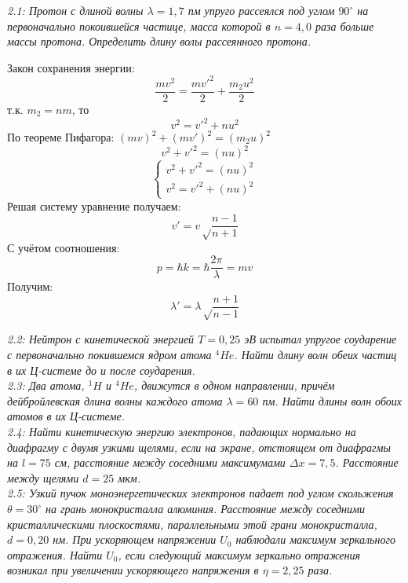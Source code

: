     \emph{2.1: Протон с длиной волны \( \lambda = 1,7 \) пм упруго
    	рассеялся под углом \( 90^{\circ} \) на первоначально покоившейся 
    	частице, масса которой в \( n = 4,0 \) раза больше массы протона. 
    	Определить длину волы рассеянного протона.}

        Закон сохранения энергии: 
        \[
            \frac{mv^2}{2} = \frac{mv'^2}{2} + \frac{m_2u^2}{2}
        \]
        т.к. \( m_2 = nm \), то
        \[ v^2 = v'^2 + nu^2 \]
        По теореме Пифагора: \( (mv)^2 + (mv')^2 = (m_2u)^2 \)
        \[ v^2 + v'^2 = (nu)^2 \]
        \begin{equation*}
            \left\{\begin{aligned}
                v^2 + v'^2 = (nu)^2 \\
                v^2 = v'^2 + (nu)^2
            \end{aligned}\right.
        \end{equation*}
        Решая систему уравнение получаем:
        \[ v' = v\sqrt\frac{n-1}{n+1} \]
        С учётом соотношения:
        \[ p = \hbar k = \hbar\frac{2\pi}{\lambda} = mv \]
        Получим: 
        \[ \lambda' = \lambda\sqrt\frac{n+1}{n-1} \]
    
    \emph{2.2: Нейтрон с кинетической энергией \( T = 0,25 \) эВ 
        испытал упругое соударение с первоначально покившемся ядром атома 
        \( ^4He \). Найти длину волн обеих частиц в их Ц-системе до и 
        после соударения.}\\

    \emph{2.3: Два атома, \( ^1H \) и \( ^4He \), движутся в одном 
        направлении, причём дейбройлевская длина волны каждого атома 
        \( \lambda = 60 \) пм. Найти длины волн обоих атомов в их 
        Ц-системе.}\\

    \emph{2.4: Найти кинетическую энергию электронов, падающих нормально 
        на диафрагму с двумя узкими щелями, если на экране, отстоящем от 
        диафрагмы на \( l = 75 \) см, расстояние между соседними 
        максимумами \( \Delta x = 7,5 \). Расстояние между щелями 
        \( d = 25 \) мкм.}\\

	\emph{2.5: Узкий пучок моноэнергетических электронов падает под углом
		скольжения \( \theta = 30^\circ \) на грань монокристалла алюминия. 
		Расстояние между соседними кристаллическими плоскостями, 
		параллельными этой грани монокристалла, \( d = 0,20 \) нм. 
		При ускоряющем напряжении \( U_0 \) наблюдали
		максимум зеркального отражения. Найти \( U_0 \), если следующий 
		максимум зеркально отражения возникал при увеличении ускоряющего 
		напряжения в \( \eta = 2,25 \) раза.} \\

